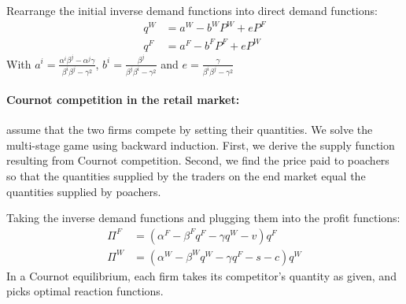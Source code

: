 Rearrange the initial inverse demand functions into direct demand functions:
\begin{align}
    q^W &= a^W - b^W P^W + e P^F\\
    q^F &= a^F - b^F P^F + eP^W
\end{align}
With $a^i = \frac{\alpha^i \beta^j - \alpha^j\gamma}{\beta^i \beta^j - \gamma^2}$, $b^i = \frac{\beta^j}{\beta^j\beta^i - \gamma^2}$ and $e = \frac{\gamma}{\beta^i\beta^j - \gamma^2}$
%
\paragraph{Cournot competition in the retail market:}
assume that the two firms compete by setting their quantities. We solve the multi-stage game using backward induction. First, we derive the supply function resulting from Cournot competition. Second, we find the price paid to poachers so that the quantities supplied by the traders on the end market equal the quantities supplied by poachers. 

Taking the inverse demand functions and plugging them into the profit functions:
\begin{align*}
    \Pi^F& = (\alpha^F - \beta^F q^F - \gamma q^W - v)q^F\\
    \Pi^W &= (\alpha^W - \beta^W q^W - \gamma q^F - s - c)q^W
\end{align*}
In a Cournot equilibrium, each firm takes its competitor's quantity as given, and picks optimal reaction functions.

